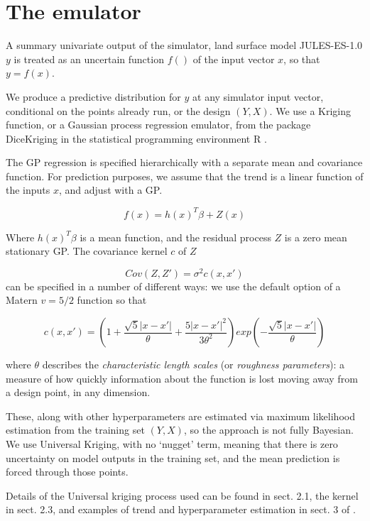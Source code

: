 \documentclass[gmd, manuscript]{copernicus}
\begin{document}
\section{The emulator}\label{app:emulator}

A summary univariate output of the simulator, land surface model JULES-ES-1.0 $y$ is treated as an uncertain function $f()$ of the input vector $x$, so that $y = f(x)$. 

We produce a predictive distribution for $y$ at any simulator input vector, conditional on the points already run, or the design $(Y, X)$. We use a Kriging function, or a Gaussian process regression emulator, from the package DiceKriging \citep{roustant2012dicekriging} in the statistical programming environment R \citep{Rcore2016}.

The GP regression is specified hierarchically with a separate mean and covariance function. For prediction purposes, we assume that the trend is a linear function of the inputs $x$, and adjust with a GP. 

$$
f(x) = h(x)^T \beta + Z(x)
$$

Where $h(x)^T \beta$ is a mean function, and the residual process $Z$ is a zero mean stationary GP. The covariance kernel $c$ of $Z$ 

$$
Cov(Z, Z') = \sigma^2 c(x,x')
$$
can be specified in a number of different ways: we use the default option of a Matern $v=5/2$ function so that

$$
c(x,x') = (1 + \frac{\sqrt{5} | x - x'|}{\theta} + \frac{5 | x - x'|^2}{3 \theta^2})exp(- \frac{\sqrt{5} |x-x'|}{\theta})
$$

where $\theta$ describes the \emph{characteristic length scales} (or \emph{roughness parameters}): a measure of how quickly information about the function is lost moving away from a design point, in any dimension. 

These, along with other hyperparameters are estimated via maximum likelihood estimation from the training set $(Y, X)$, so the approach is not fully Bayesian. We use Universal Kriging, with no `nugget' term, meaning that there is zero uncertainty on model outputs in the training set, and the mean prediction is forced through those points. 

Details of the Universal kriging process used can be found in sect. 2.1, the kernel in sect. 2.3, and examples of trend and hyperparameter estimation in sect. 3 of \cite{roustant2012dicekriging}. 
\end{document}
